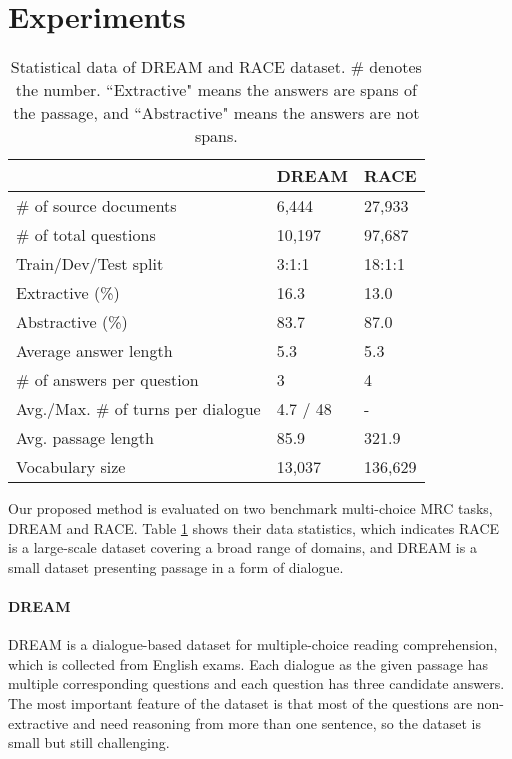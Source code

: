 \documentclass[letterpaper]{article} \usepackage{aaai21}  \usepackage{times}  \usepackage{helvet} \usepackage{courier}  \usepackage[hyphens]{url}  \usepackage{graphicx} \urlstyle{rm} \def\UrlFont{\rm}  \usepackage{natbib}  \usepackage{caption} \frenchspacing  \setlength{\pdfpagewidth}{8.5in}  \setlength{\pdfpageheight}{11in}
\begin{document}
\section{Experiments}
\begin{table}[t]\small
\renewcommand\arraystretch{1.1}
	\centering
	{
		\begin{tabular}{l|l|l}
			\hline		
			  & DREAM & RACE  \\
			\hline
			\hline
			\# of source documents & 6,444 & 27,933    \\
			\# of total questions & 10,197 & 97,687 \\
			Train/Dev/Test split & 3:1:1 &18:1:1 \\
			Extractive (\%)   & 16.3 & 13.0   \\
			Abstractive (\%)  & 83.7  & 87.0 \\
			Average answer length  & 5.3 & 5.3  \\
			\# of answers per question & 3 & 4 \\
			Avg./Max. \# of turns per dialogue & 4.7 / 48 & -  \\
			Avg. passage length & 85.9 & 321.9  \\
			Vocabulary size  & 13,037 & 136,629 \\
			\hline
		\end{tabular}
		
	}
	\caption{\label{statistics} Statistical data of DREAM and RACE dataset. \# denotes the number. ``Extractive" means the answers are spans of the passage, and ``Abstractive" means the answers are not spans.}
\end{table}

Our proposed method is evaluated on two benchmark multi-choice MRC tasks, DREAM and RACE. Table \ref{statistics} shows their data statistics, which indicates RACE is a large-scale dataset covering a broad range of domains, and DREAM is a small dataset presenting passage in a form of dialogue.

\paragraph{DREAM} DREAM \cite{dream} is a dialogue-based dataset for multiple-choice reading comprehension, which is collected from English exams. Each dialogue as the given passage has multiple corresponding questions and each question has three candidate answers. The most important feature of the dataset is that most of the questions are non-extractive and need reasoning from more than one sentence, so the dataset is small but still challenging. 
\end{document}
